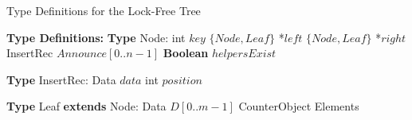     \begin{algorithm}[htbp]
        \footnotesize
        \caption{Type Definitions for the Lock-Free Tree}
        \label{alg:tree-types}
        \begin{algorithmic}[1]
            \Statex \textbf{Type Definitions:}
            \State \textbf{Type} Node:
            \State \quad int $\mathit{key}$
            \State \quad $\{Node,Leaf\}$ *$\mathit{left}$
            \State \quad $\{Node,Leaf\}$ *$\mathit{right}$
            \State \quad InsertRec $\mathit{Announce}[0..n-1]$
            \State \quad \textbf{Boolean} $\mathit{helpersExist}$
    
            \Statex
            \State \textbf{Type} InsertRec:
            \State \quad Data $\mathit{data}$
            \State \quad int $\mathit{position}$
    
            \Statex
            \State \textbf{Type} Leaf \textbf{extends} Node:
            \State \quad Data $D[0..m-1]$
            \State \quad CounterObject Elements
        \end{algorithmic}
    \end{algorithm}
    


